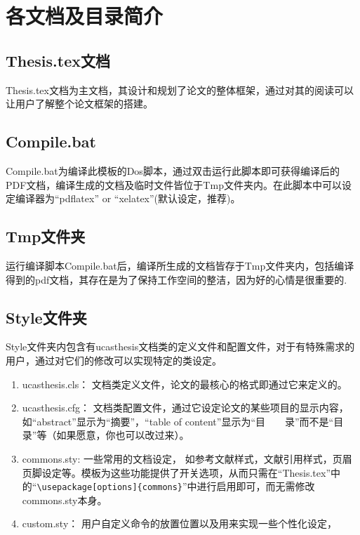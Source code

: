 \section{各文档及目录简介}

\subsection{Thesis.tex文档 }

Thesis.tex文档为主文档，其设计和规划了论文的整体框架，通过对其的阅读可以让用户了解整个论文框架的搭建。

\subsection{Compile.bat}

Compile.bat为编译此模板的Dos脚本，通过双击运行此脚本即可获得编译后的PDF文档，编译生成的文档及临时文件皆位于Tmp文件夹内。在此脚本中可以设定编译器为“pdflatex” or “xelatex”(默认设定，推荐)。

\subsection{Tmp文件夹}

运行编译脚本Compile.bat后，编译所生成的文档皆存于Tmp文件夹内，包括编译得到的pdf文档，其存在是为了保持工作空间的整洁，因为好的心情是很重要的.

\subsection{Style文件夹}

Style文件夹内包含有ucasthesis文档类的定义文件和配置文件，对于有特殊需求的用户，通过对它们的修改可以实现特定的类设定。

\begin{enumerate}
  \item ucasthesis.cls： 文档类定义文件，论文的最核心的格式即通过它来定义的。
  \item ucasthesis.cfg： 文档类配置文件，通过它设定论文的某些项目的显示内容，如“abstract”显示为“摘要”，“table of content”显示为“目~~~~录”而不是“目录”等（如果愿意，你也可以改过来）。
  \item commons.sty: 一些常用的文档设定， 如参考文献样式，文献引用样式，页眉页脚设定等。模板为这些功能提供了开关选项，从而只需在“Thesis.tex”中的“\verb+\usepackage[options]{commons}+”中进行启用即可，而无需修改commons.sty本身。
  \item custom.sty： 用户自定义命令的放置位置以及用来实现一些个性化设定，
\end{enumerate}

